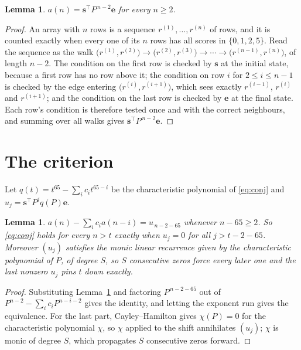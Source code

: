 \documentclass[11pt,a4paper]{article}
\theoremstyle{plain}
\newtheorem{lemma}[theorem]{Lemma}
\theoremstyle{definition}
\begin{document}
\begin{lemma}\label{lem:walk}
$a(n)=\mathbf{s}^{\!\top}P^{\,n-2}\mathbf{e}$ for every $n\ge2$.
\end{lemma}

\begin{proof}
An array with $n$ rows is a sequence $r^{(1)},\dots,r^{(n)}$ of rows, and it is counted
exactly when every one of its $n$ rows has all scores in $\{0,1,2,5\}$. Read the sequence as the
walk $\bigl(r^{(1)},r^{(2)}\bigr)\to\bigl(r^{(2)},r^{(3)}\bigr)\to\cdots\to
\bigl(r^{(n-1)},r^{(n)}\bigr)$, of length $n-2$. The condition on the first row is
checked by $\mathbf{s}$ at the initial state, because a first row has no row above it; the
condition on row $i$ for $2\le i\le n-1$ is checked by the edge entering
$\bigl(r^{(i)},r^{(i+1)}\bigr)$, which sees exactly $r^{(i-1)}$, $r^{(i)}$ and
$r^{(i+1)}$; and the condition on the last row is checked by $\mathbf{e}$ at the final
state. Each row's condition is therefore tested once and with the correct neighbours, and
summing over all walks gives $\mathbf{s}^{\!\top}P^{\,n-2}\mathbf{e}$.
\end{proof}

\section{The criterion}

Let $q(t)=t^{65}-\sum_i c_i t^{65-i}$ be the characteristic polynomial of
\eqref{eq:conj} and $u_j=\mathbf{s}^{\!\top}P^{j}q(P)\mathbf{e}$.

\begin{lemma}\label{lem:crit}
$a(n)-\sum_i c_i a(n-i)=u_{\,n-2-65}$ whenever $n-65\ge2$. So \eqref{eq:conj}
holds for every $n>t$ exactly when $u_j=0$ for all $j>t-2-65$. Moreover $(u_j)$
satisfies the monic linear recurrence given by the characteristic polynomial of $P$, of
degree $S$, so $S$ consecutive zeros force every later one and the last nonzero $u_j$ pins
$t$ down exactly.
\end{lemma}

\begin{proof}
Substituting Lemma~\ref{lem:walk} and factoring $P^{\,n-2-65}$ out of
$P^{n-2}-\sum_i c_i P^{n-i-2}$ gives the identity, and letting the exponent run gives the
equivalence. For the last part, Cayley--Hamilton gives $\chi(P)=0$ for the characteristic
polynomial $\chi$, so $\chi$ applied to the shift annihilates $(u_j)$; $\chi$ is monic of
degree $S$, which propagates $S$ consecutive zeros forward.
\end{proof}
\end{document}

